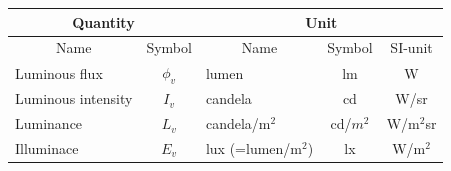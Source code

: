\begin{table}[ht]
	\centering
	\begin{tabular}{ |p{5cm} p{2cm}|p{5cm} p{2cm} p{2cm}|  }
		\hline
		\multicolumn{2}{|c}{Quantity}&\multicolumn{3}{|c|}{Unit} \\
		\hline\hline
		\multicolumn{1}{|c}{Name}			& \multicolumn{1}{|c|}{Symbol}	& \multicolumn{1}{c}{Name}	& \multicolumn{1}{|c|}{Symbol}	& \multicolumn{1}{|c|}{SI-unit}\\
		
		\hline
		Luminous flux		& \multicolumn{1}{|c|}{$\phi_v$}	& lumen		& \multicolumn{1}{|c|}{lm}& \multicolumn{1}{|c|}{W}\\
		Luminous intensity 	& \multicolumn{1}{|c|}{$I_v$} 		& candela	& \multicolumn{1}{|c|}{cd}& \multicolumn{1}{|c|}{W/sr}\\
		Luminance			& \multicolumn{1}{|c|}{$L_v$}		& candela/$\text{m}^2$	& \multicolumn{1}{|c|}{cd/$m^2$}& \multicolumn{1}{|c|}{W/$\text{m}^2$sr}\\
		Illuminace 			& \multicolumn{1}{|c|}{$E_v$} 		& lux (=lumen/$\text{m}^2$) 	& \multicolumn{1}{|c|}{lx}& \multicolumn{1}{|c|}{W/$\text{m}^2$}\\
		
		\hline
	\end{tabular}
\end{table}
